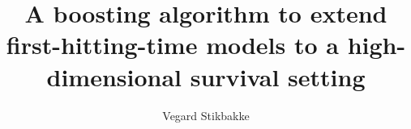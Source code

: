 \documentclass[a4paper, USenglish, dvipsnames, svgnames, cmyk, final]{memoir}
\title{A boosting algorithm to extend first-hitting-time models to a high-dimensional survival setting}
\author
{
    Vegard Stikbakke
}
\begin{document}
    \frontmatter        %

    \masterfrontpage

    
    
    \cleartorecto
    
    \cleartorecto

    

    \cleartorecto
    \begin{KeepFromToc}
      \tableofcontents
    \end{KeepFromToc}

    \mainmatter         %

    

    

    

    

    

    

    

    

    \appendix           %
    \appendixpage       %

    

    

    \backmatter         %

    
    
\end{document}
